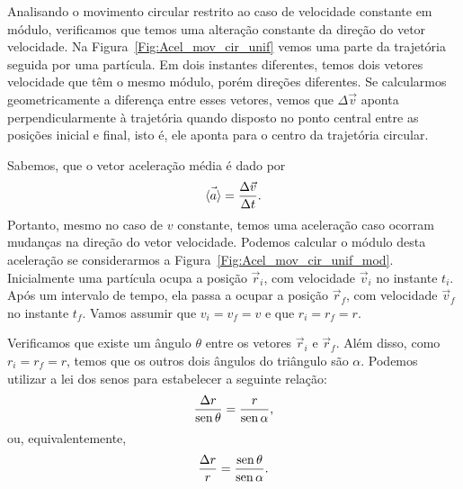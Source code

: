 Analisando o movimento circular restrito ao caso de velocidade constante em módulo, verificamos que temos uma alteração constante da direção do vetor velocidade. Na Figura~\ref{Fig:Acel_mov_cir_unif} vemos uma parte da trajetória seguida por uma partícula. Em dois instantes diferentes, temos dois vetores velocidade que têm o mesmo módulo, porém direções diferentes. Se calcularmos geometricamente a diferença entre esses vetores, vemos que $\Delta \vec{v}$ aponta perpendicularmente à trajetória quando disposto no ponto central entre as posições inicial e final, isto é, ele aponta para o centro da trajetória circular.

Sabemos, que o vetor aceleração média é dado por
\begin{equation}
  \vec{\left\langle{a}\right\rangle} = \frac{\Delta \vec{v}}{\Delta t}.
\end{equation}
%
Portanto, mesmo no caso de $v$ constante, temos uma aceleração caso ocorram mudanças na direção do vetor velocidade. Podemos calcular o módulo desta aceleração se considerarmos a Figura~\ref{Fig:Acel_mov_cir_unif_mod}. Inicialmente uma partícula ocupa a posição $\vec{r}_i$, com velocidade $\vec{v}_i$ no instante $t_i$. Após um intervalo de tempo, ela passa a ocupar a posição $\vec{r}_f$, com velocidade $\vec{v}_f$ no instante $t_f$. Vamos assumir que $v_i = v_f = v$ e que $r_i = r_f = r$. 

Verificamos que existe um ângulo $\theta$ entre os vetores $\vec{r}_i$ e $\vec{r}_f$. Além disso, como $r_i = r_f = r$, temos que os outros dois ângulos do triângulo são $\alpha$. Podemos utilizar a lei dos senos para estabelecer a seguinte relação:
\begin{equation}
    \frac{\Delta r}{\operatorname{sen} \theta} = \frac{r}{\operatorname{sen} \alpha},
\end{equation}
%
ou, equivalentemente,
\begin{equation}
    \frac{\Delta r}{r} = \frac{\operatorname{sen} \theta}{\operatorname{sen} \alpha}.
\end{equation}


